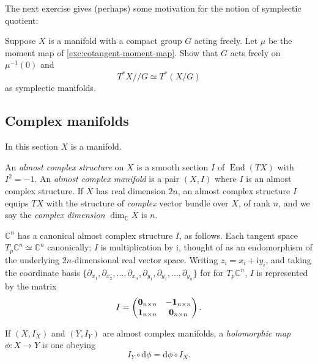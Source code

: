\documentclass[12pt,letterpaper,reqno]{article}
\numberwithin{equation}{section}
\newcommand{\C}{\ensuremath{\mathbb C}}
\newcommand{\kq}{/\!\!/}
\newcommand{\I}{{\mathrm i}}
\newcommand{\de}{\mathrm{d}}
\newcommand{\ti}[1]{\textit{#1}}
\DeclareMathOperator{\End}{End}
\begin{document}
The next exercise gives (perhaps) some motivation
for the notion of symplectic quotient:

\begin{exercise} \label{exc:cotangent-symplectic-quotients}
Suppose $X$ is a manifold
with a compact group $G$ acting freely. Let $\mu$
be the moment map of \autoref{exc:cotangent-moment-map}.
Show that $G$ acts freely on $\mu^{-1}(0)$ and
\begin{equation}
T^*X \kq G \simeq T^*(X/G)
\end{equation}
as symplectic manifolds.
\end{exercise}


\subsection{Complex manifolds}
In this section $X$ is a manifold.

\begin{defn}
An \ti{almost complex structure} on $X$ is a smooth section $I$ of $\End(TX)$ with $I^2 = -1$. An \ti{almost complex manifold} is a pair $(X,I)$ where $I$ is an almost complex structure.
If $X$ has real dimension $2n$, an almost complex
structure $I$ equips $TX$ with the structure of
\ti{complex} vector bundle over $X$, of rank $n$,
and we say the \ti{complex dimension} $\dim_\C X$ is
$n$.
\end{defn}

\begin{example} $\C^n$ has a canonical almost complex structure $I$, as follows. Each tangent space $T_p \C^n \simeq \C^n$ canonically; $I$ is multiplication by $\I$, thought of as an
endomorphism of the underlying $2n$-dimensional real vector space.
Writing $z_i = x_i + \I y_i$, and taking the coordinate basis
$\{\partial_{x_1}, \partial_{x_2}, \dots, \partial_{x_n}, \partial_{y_1}, \partial_{y_2}, \dots, \partial_{y_n}\}$ for for $T_p \C^n$, $I$ is represented by the matrix
\begin{equation}
   I = \begin{pmatrix} {\bf 0}_{n \times n} & -{\bf 1}_{n \times n} \\ {\bf 1}_{n \times n} & {\bf 0}_{n \times n} \end{pmatrix}.
\end{equation}
\end{example}

\begin{defn} \label{def:holomorphic-maps} If $(X,I_X)$ and $(Y,I_Y)$ are almost
complex manifolds, a \ti{holomorphic map} $\phi: X \to Y$
is one obeying
\begin{equation}
 I_Y \circ \de \phi = \de \phi \circ I_X.
\end{equation}
\end{defn}
\end{document}
